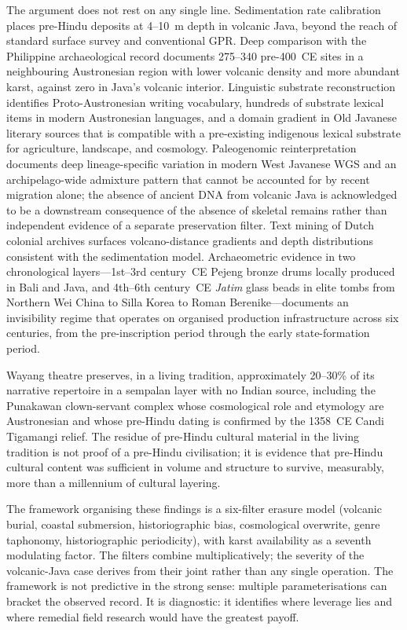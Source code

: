 \documentclass[12pt,a4paper]{article}
\begin{document}
The argument does not rest on any single line. Sedimentation rate calibration places pre-Hindu deposits at 4--10~m depth in volcanic Java, beyond the reach of standard surface survey and conventional GPR. Deep comparison with the Philippine archaeological record documents 275--340 pre-400~CE sites in a neighbouring Austronesian region with lower volcanic density and more abundant karst, against zero in Java's volcanic interior. Linguistic substrate reconstruction identifies Proto-Austronesian writing vocabulary, hundreds of substrate lexical items in modern Austronesian languages, and a domain gradient in Old Javanese literary sources that is compatible with a pre-existing indigenous lexical substrate for agriculture, landscape, and cosmology. Paleogenomic reinterpretation documents deep lineage-specific variation in modern West Javanese WGS and an archipelago-wide admixture pattern that cannot be accounted for by recent migration alone; the absence of ancient DNA from volcanic Java is acknowledged to be a downstream consequence of the absence of skeletal remains rather than independent evidence of a separate preservation filter. Text mining of Dutch colonial archives surfaces volcano-distance gradients and depth distributions consistent with the sedimentation model. Archaeometric evidence in two chronological layers---1st--3rd century~CE Pejeng bronze drums locally produced in Bali and Java, and 4th--6th century~CE \textit{Jatim} glass beads in elite tombs from Northern Wei China to Silla Korea to Roman Berenike---documents an invisibility regime that operates on organised production infrastructure across six centuries, from the pre-inscription period through the early state-formation period.

Wayang theatre preserves, in a living tradition, approximately 20--30\% of its narrative repertoire in a sempalan layer with no Indian source, including the Punakawan clown-servant complex whose cosmological role and etymology are Austronesian and whose pre-Hindu dating is confirmed by the 1358~CE Candi Tigamangi relief. The residue of pre-Hindu cultural material in the living tradition is not proof of a pre-Hindu civilisation; it is evidence that pre-Hindu cultural content was sufficient in volume and structure to survive, measurably, more than a millennium of cultural layering.

The framework organising these findings is a six-filter erasure model (volcanic burial, coastal submersion, historiographic bias, cosmological overwrite, genre taphonomy, historiographic periodicity), with karst availability as a seventh modulating factor. The filters combine multiplicatively; the severity of the volcanic-Java case derives from their joint rather than any single operation. The framework is not predictive in the strong sense: multiple parameterisations can bracket the observed record. It is diagnostic: it identifies where leverage lies and where remedial field research would have the greatest payoff.
\end{document}
